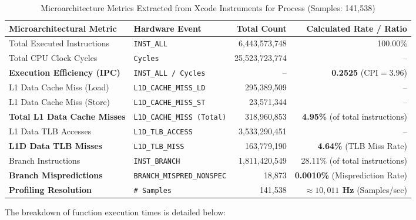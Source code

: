 \documentclass{article}
\begin{document}
	\begin{table}[htbp]
		\centering
		\caption{Microarchitecture Metrics Extracted from Xcode Instruments for Process (Samples: 141,538)}
		\label{tab:microarchitecture_metrics_full}
		\begin{tabular}{llrr}
			\toprule
			\textbf{Microarchitectural Metric} & \textbf{Hardware Event} & \textbf{Total Count} & \textbf{Calculated Rate / Ratio} \\
			\midrule
			Total Executed Instructions & \texttt{INST\_ALL} & 6,443,573,748 & 100.00\% \\
			Total CPU Clock Cycles & \texttt{Cycles} & 25,523,723,774 & -- \\
			\textbf{Execution Efficiency (IPC)} & \texttt{INST\_ALL / Cycles} & -- & \textbf{0.2525} ($\text{CPI} = 3.96$) \\
			\midrule
			L1 Data Cache Miss (Load) & \texttt{L1D\_CACHE\_MISS\_LD} & 295,389,509 & -- \\
			L1 Data Cache Miss (Store) & \texttt{L1D\_CACHE\_MISS\_ST} & 23,571,344 & -- \\
			\textbf{Total L1 Data Cache Misses} & \texttt{L1D\_CACHE\_MISS (Total)} & 318,960,853 & \textbf{4.95\%} (of total instructions) \\
			\midrule
			L1 Data TLB Accesses & \texttt{L1D\_TLB\_ACCESS} & 3,533,290,451 & -- \\
			\textbf{L1D Data TLB Misses} & \texttt{L1D\_TLB\_MISS} & 163,779,190 & \textbf{4.64\%} (TLB Miss Rate) \\
			\midrule
			Branch Instructions & \texttt{INST\_BRANCH} & 1,811,420,549 & 28.11\% (of total instructions) \\
			\textbf{Branch Mispredictions} & \texttt{BRANCH\_MISPRED\_NONSPEC} & 18,873 & \textbf{0.0010\%} (Misprediction Rate) \\
			\midrule
			\textbf{Profiling Resolution} & \texttt{\# Samples} & 141,538 & \textbf{$\approx 10,011$ Hz} (Samples/sec) \\
			\bottomrule
		\end{tabular}
	\end{table}
	
	The breakdown of function execution times is detailed below:
	
\end{document}
